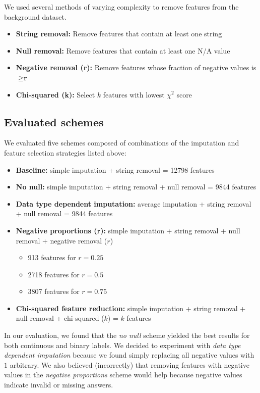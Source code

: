 \documentclass{article} %
\begin{document}
We used several methods of varying complexity to remove features from the background dataset.

\begin{itemize}
  \item \textbf{String removal:} Remove features that contain at least one string
  \item \textbf{Null removal:} Remove features that contain at least one N/A value
  \item \textbf{Negative removal (r):} Remove features whose fraction of negative values is $\geq \texttt{r}$
  \item \textbf{Chi-squared (k):} Select $k$ features with lowest $\chi^2$ score
\end{itemize}

\subsection{Evaluated schemes}
\label{sec:evaluatedschemes}

We evaluated five schemes composed of combinations of the imputation and feature selection strategies listed above:

\begin{itemize}
\item \textbf{Baseline:} simple imputation + string removal = 12798 features
\item \textbf{No null:} simple imputation + string removal + null removal = 9844 features
\item \textbf{Data type dependent imputation:} average imputation + string removal + null removal = 9844 features
\item \textbf{Negative proportions (r):} simple imputation + string removal + null removal + negative removal ($r$)
  \begin{itemize}
    \item{913 features for $r = 0.25$}
    \item{2718 features for $r = 0.5$}
    \item{3807 features for $r = 0.75$}
  \end{itemize}
\item \textbf{Chi-squared feature reduction:} simple imputation + string removal + null removal + chi-squared ($k$) = $k$ features
\end{itemize}

In our evaluation, we found that the \textit{no null} scheme yielded the best results for both continuous and binary labels. We decided to experiment with \textit{data type dependent imputation} because we found simply replacing all negative values with $1$ arbitrary. We also believed (incorrectly) that removing features with negative values in the \textit{negative proportions} scheme would help because negative values indicate invalid or missing answers.
\end{document}
